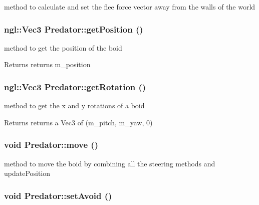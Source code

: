 method to calculate and set the flee force vector away from the walls of the world \hypertarget{classPredator_a55f8b25f098668a89fb65aab55e48313}{
\subsubsection[{getPosition}]{\setlength{\rightskip}{0pt plus 5cm}ngl::Vec3 Predator::getPosition ()}}
\label{classPredator_a55f8b25f098668a89fb65aab55e48313}


method to get the position of the boid \begin{DoxyReturn}{Returns}
returns m\_\-position 
\end{DoxyReturn}
\hypertarget{classPredator_ac121a9634fefa30e33b13468bbbd61c2}{
\subsubsection[{getRotation}]{\setlength{\rightskip}{0pt plus 5cm}ngl::Vec3 Predator::getRotation ()}}
\label{classPredator_ac121a9634fefa30e33b13468bbbd61c2}


method to get the x and y rotations of a boid \begin{DoxyReturn}{Returns}
returns a Vec3 of (m\_\-pitch, m\_\-yaw, 0) 
\end{DoxyReturn}
\hypertarget{classPredator_ac387f969b16cf3651b097f4470368683}{
\subsubsection[{move}]{\setlength{\rightskip}{0pt plus 5cm}void Predator::move ()}}
\label{classPredator_ac387f969b16cf3651b097f4470368683}


method to move the boid by combining all the steering methods and updatePosition \hypertarget{classPredator_a54ad9e14349cb678e2a8bef745c77ffb}{
\subsubsection[{setAvoid}]{\setlength{\rightskip}{0pt plus 5cm}void Predator::setAvoid ()}}
\label{classPredator_a54ad9e14349cb678e2a8bef745c77ffb}


